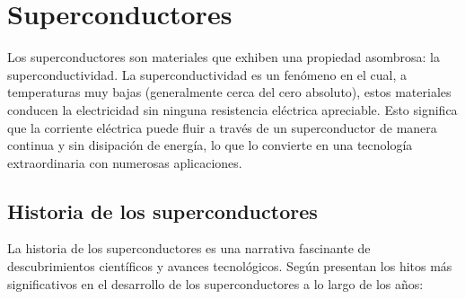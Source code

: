 \documentclass[10.5pt]{article}
\begin{document}
    \section{Superconductores}
    Los superconductores son materiales que exhiben una propiedad asombrosa: la superconductividad. La superconductividad es un fenómeno en el cual, a temperaturas muy bajas (generalmente cerca del cero absoluto), estos materiales conducen la electricidad sin ninguna resistencia eléctrica apreciable. Esto significa que la corriente eléctrica puede fluir a través de un superconductor de manera continua y sin disipación de energía, lo que lo convierte en una tecnología extraordinaria con numerosas aplicaciones.
    \subsection{Historia de los superconductores}
    La historia de los superconductores es una narrativa fascinante de descubrimientos científicos y avances tecnológicos. Según presentan los hitos más significativos en el desarrollo de los superconductores a lo largo de los años:
\end{document}
